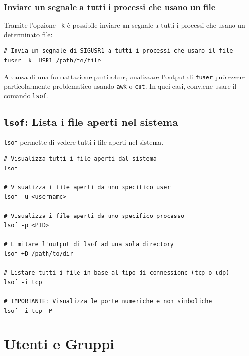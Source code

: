 \documentclass[a4paper]{report}
\newenvironment{info}{\begin{tcolorbox}[fonttitle=\sffamily\bfseries\large,title=Info,colframe=blue!75!white]}{\end{tcolorbox}}
\newenvironment{code}{\begin{tcolorbox}[size=small]}{\end{tcolorbox}}
\begin{document}
\subsection{Inviare un segnale a tutti i processi che usano un file}

Tramite l'opzione \texttt{-k} è possibile inviare un segnale a tutti i processi che usano un determinato file:

\begin{code} 
\begin{lstlisting}
# Invia un segnale di SIGUSR1 a tutti i processi che usano il file
fuser -k -USR1 /path/to/file
\end{lstlisting}
\end{code}

\begin{info}
	A causa di una formattazione particolare, analizzare l'output di \texttt{fuser} può essere particolarmente problematico usando \texttt{awk} o \texttt{cut}. In quei casi, conviene usare il comando \texttt{lsof}.
\end{info}

\section{\texttt{lsof}: Lista i file aperti nel sistema}

\texttt{lsof} permette di vedere tutti i file aperti nel sistema.

\begin{code} 
\begin{lstlisting}
# Visualizza tutti i file aperti dal sistema
lsof

# Visualizza i file aperti da uno specifico user
lsof -u <username>

# Visualizza i file aperti da uno specifico processo
lsof -p <PID>

# Limitare l'output di lsof ad una sola directory
lsof +D /path/to/dir

# Listare tutti i file in base al tipo di connessione (tcp o udp)
lsof -i tcp

# IMPORTANTE: Visualizza le porte numeriche e non simboliche
lsof -i tcp -P
\end{lstlisting}
\end{code}

\chapter{Utenti e Gruppi}
\end{document}
